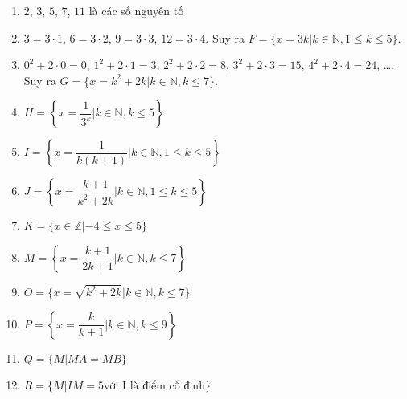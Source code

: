 \begin{bt}
{\begin{enumerate}
			\item  $2$, $3$, $5$, $7$, $11$ là các số nguyên tố
			\item $3=3\cdot 1$, $6=3\cdot  2$, $9=3\cdot 3$, $12=3\cdot 4$. Suy ra $F=\{x=3k| k\in\mathbb{N}, 1\le k\le 5\}$.
			\item $0^2+2\cdot 0=0$, $1^2+2\cdot 1=3$,  $2^2+2\cdot 2=8$, $3^2+2\cdot 3=15$, $4^2+2\cdot 4=24$, \ldots. Suy ra $G=\{x=k^2+2k|k\in\mathbb{N}, k\le 7\}$.
			\item  $H=\left\{x=\dfrac{1}{3^k}|k\in\mathbb{N}, k\le 5\right\}$
			\item $I=\left\{x=\dfrac{1}{k(k+1)}|k\in\mathbb{N},1\le  k\le 5\right\}$
			\item $J=\left\{x=\dfrac{k+1}{k^2+2k}|k\in\mathbb{N},1\le k\le  5\right\}$
			\item $K=\{x\in\mathbb{Z}|-4\le x\le  5\}$
			\item $M=\left\{x=\dfrac{k+1}{2k+1}|k\in\mathbb{N}, k\le 7\right\}$ 
			\item $O=\{x=\sqrt{k^2+2k}|k\in\mathbb{N},k\le 7\}$ 
			 \item $P=\left\{x=\dfrac{k}{k+1}|k\in\mathbb{N}, k\le 9\right\}$
			\item  $Q=\{M|MA=MB\}$
			\item $R=\{M|IM=5\text{với I  là điểm cố định}\}$
		\end{enumerate}
	} 
\end{bt}

